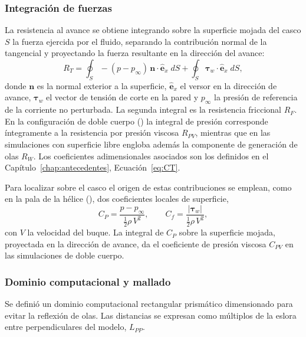 \subsubsection{Integración de fuerzas}
La resistencia al avance se obtiene integrando sobre la superficie mojada
del casco $S$ la fuerza ejercida por el fluido, separando la contribución
normal de la tangencial y proyectando la fuerza resultante en la dirección del avance:
%
\begin{equation}\label{eq:integracion_fuerzas}
    R_T = \oint_S -(p - p_\infty)\,
          \mathbf{n}\cdot\hat{\mathbf{e}}_x \; dS
        + \oint_S \boldsymbol{\tau}_w \cdot
          \hat{\mathbf{e}}_x \; dS ,
\end{equation}
%
donde $\mathbf{n}$ es la normal exterior a la superficie,
$\hat{\mathbf{e}}_x$ el versor en la dirección de avance,
$\boldsymbol{\tau}_w$ el vector de tensión de corte en la pared y
$p_\infty$ la presión de referencia de la corriente no perturbada. La
segunda integral es la resistencia friccional $R_F$. En la configuración de
doble cuerpo () la integral de presión
corresponde íntegramente a la resistencia por presión viscosa $R_{PV}$,
mientras que en las simulaciones con superficie libre engloba además la
componente de generación de olas $R_W$. Los coeficientes adimensionales
asociados son los definidos en el Capítulo~\ref{chap:antecedentes},
Ecuación~\eqref{eq:CT}.

Para localizar sobre el casco el origen de estas contribuciones se emplean, como en la pala de la hélice (), dos coeficientes locales de superficie,
%
\begin{equation}
    C_P = \frac{p - p_\infty}{\tfrac{1}{2}\rho\,V^2},
    \qquad
    C_f = \frac{|\boldsymbol{\tau}_w|}{\tfrac{1}{2}\rho\,V^2},
    \label{eq:cp_cf_casco}
\end{equation}
%
con $V$ la velocidad del buque. La integral de $C_P$ sobre la superficie mojada, proyectada en la dirección de avance, da el coeficiente de presión viscosa $C_{PV}$ en las simulaciones de doble cuerpo.

\subsubsection{Dominio computacional y mallado}
\label{sec:mallado_general}

Se definió un dominio computacional rectangular prismático dimensionado para evitar la reflexión de olas. Las distancias se expresan como múltiplos de la eslora entre perpendiculares del modelo, $L_{PP}$.

